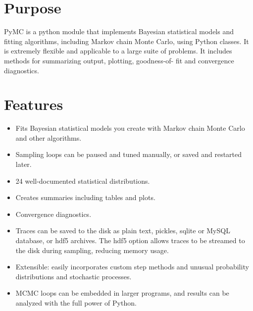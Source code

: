 





\hypertarget{purpose}{}
\section*{Purpose}
\label{purpose}

PyMC is a python module that implements Bayesian statistical models and
fitting algorithms, including Markov chain Monte Carlo, using Python classes.
It is extremely flexible and applicable to a large suite of problems. It
includes methods for summarizing output, plotting, goodness-of- fit and
convergence diagnostics.



\hypertarget{features}{}
\section*{Features}
\label{features}
\begin{itemize}
\item {} 
Fits Bayesian statistical models you create with Markov chain Monte Carlo and
other algorithms.

\item {} 
Sampling loops can be paused and tuned manually, or saved and restarted later.

\item {} 
24 well-documented statistical distributions.

\item {} 
Creates summaries including tables and plots.

\item {} 
Convergence diagnostics.

\item {} 
Traces can be saved to the disk as plain text, pickles, sqlite or MySQL
database, or hdf5 archives. The hdf5 option allows traces to be streamed
to the disk during sampling, reducing memory usage.

\item {} 
Extensible: easily incorporates custom step methods and unusual probability
distributions and stochastic processes.

\item {} 
MCMC loops can be embedded in larger programs, and results can be analyzed
with the full power of Python.

\end{itemize}


